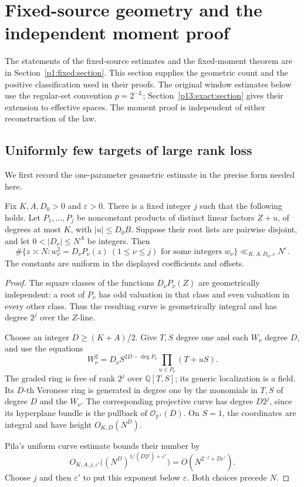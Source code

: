 \section{Fixed-source geometry and the independent moment proof}
\label{p14:comp:fixed}

The statements of the fixed-source estimates and the fixed-moment theorem
are in Section~\ref{p1:fixed:section}. This section supplies the geometric
count and the positive classification used in their proofs. The original
window estimates below use the regular-set convention $p=2^{-L}$;
Section~\ref{p13:exact:section} gives their extension to effective spaces.
The moment proof is independent of either reconstruction of the law.

\subsection{Uniformly few targets of large rank loss}

We first record the one-parameter geometric estimate in the
precise form needed here.

\begin{lemma}
\label{p1:fixed:curve}
Fix \(K,A,D_0>0\) and \(\varepsilon>0\).
There is a fixed integer \(j\) such that the following holds.
Let \(P_1,\ldots,P_j\) be nonconstant products of distinct
linear factors \(Z+u\), of degrees at most \(K\), with
\(|u|\le D_0B\). Suppose their root lists are pairwise disjoint,
and let \(0<|D_\nu|\le N^A\) be integers. Then
\[
 \#\{z\asymp N:
       w_\nu^2=D_\nu P_\nu(z)\ (1\le\nu\le j)
       \text{ for some integers }w_\nu\}
       \ll_{K,A,D_0,\varepsilon}N^\varepsilon .
\]
The constants are uniform in the displayed coefficients and
offsets.
\end{lemma}

\begin{proof}
The square classes of the functions \(D_\nu P_\nu(Z)\) are
geometrically independent: a root of \(P_\nu\) has odd
valuation in that class and even valuation in every other
class. Thus the resulting curve is geometrically integral
and has degree \(2^j\) over the \(Z\)-line.

Choose an integer \(D\ge(K+A)/2\). Give \(T,S\) degree one
and each \(W_\nu\) degree \(D\), and use the equations
\[
 W_\nu^2
   =D_\nu S^{2D-\deg P_\nu}
       \prod_{u\in P_\nu}(T+uS).
\]
The graded ring is free of rank \(2^j\) over \(\mathbb Q[T,S]\);
its generic localization is a field. Its \(D\)-th Veronese
ring is generated in degree one by the monomials in \(T,S\)
of degree \(D\) and the \(W_\nu\). The corresponding
projective curve has degree \(D2^j\), since its hyperplane
bundle is the pullback of \(\mathcal O_{\mathbb P^1}(D)\).
On \(S=1\), the coordinates are integral and have height
\(O_{K,D}(N^D)\).

Pila's uniform curve estimate
\cite[Theorem~A]{pila1995} bounds their number by
\[
 O_{K,A,j,\varepsilon'}
 \bigl((N^D)^{1/(D2^j)+\varepsilon'}\bigr)
       =O(N^{2^{-j}+D\varepsilon'}).
\]
Choose \(j\) and then \(\varepsilon'\) to put this exponent
below \(\varepsilon\). Both choices precede \(N\).
\end{proof}

